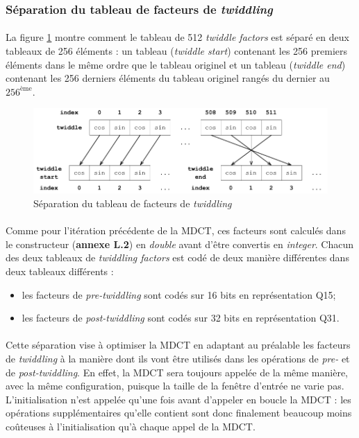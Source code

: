 \documentclass{article}
\begin{document}
    \subsubsection{Séparation du tableau de facteurs de \emph{twiddling}}
    \paragraph{}
    La figure \ref{fig:split_twiddles} montre comment le tableau de 512 \emph{twiddle factors} est séparé en deux tableaux de 256 éléments : un tableau (\emph{twiddle start}) contenant les 256 premiers éléments dans le même ordre que le tableau originel et un tableau (\emph{twiddle end}) contenant les 256 derniers éléments du tableau originel rangés du dernier au $256^{\text{ème}}$.

    \begin{figure}[H]
        \centering
        \includegraphics[width=.8\linewidth]{./images/split_twiddles.pdf}
        \caption{Séparation du tableau de facteurs de \emph{twiddling}}
        \label{fig:split_twiddles}
    \end{figure}

    \paragraph{}
    Comme pour l'itération précédente de la MDCT, ces facteurs sont calculés dans le constructeur (\textbf{annexe L.2}) en \emph{double} avant d'être convertis en \emph{integer}. Chacun des deux tableaux de \emph{twiddling factors} est codé de deux manière différentes dans deux tableaux différents :
    \begin{itemize}
        \item les facteurs de \emph{pre-twiddling} sont codés sur 16 bits en représentation Q15;
        \item les facteurs de \emph{post-twiddling} sont codés sur 32 bits en représentation Q31.
    \end{itemize}

    \paragraph{}
    Cette séparation vise à optimiser la MDCT en adaptant au préalable les facteurs de \emph{twiddling} à la manière dont ils vont être utilisés dans les opérations de \emph{pre-} et de \emph{post-twiddling}. En effet, la MDCT sera toujours appelée de la même manière, avec la même configuration, puisque la taille de la fenêtre d'entrée ne varie pas. L'initialisation n'est appelée qu'une fois avant d'appeler en boucle la MDCT : les opérations supplémentaires qu'elle contient sont donc finalement beaucoup moins coûteuses à l'initialisation qu'à chaque appel de la MDCT.
\end{document}
